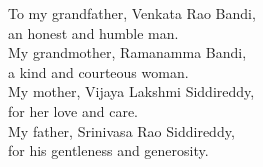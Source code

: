 \documentclass[final,numrefs,sort&compress,noinfo]{nddiss2e}
\begin{document}
\renewcommand{\dedicationname}{Dedicated to}

\begin{dedication}
  To my grandfather, Venkata Rao Bandi, \\an honest and humble man. \\My grandmother, Ramanamma Bandi, \\a kind and courteous woman. \\My mother, Vijaya Lakshmi Siddireddy, \\for her love and care. \\My father, Srinivasa Rao Siddireddy, \\for his gentleness and generosity.
\end{dedication}

\tableofcontents
\listoffigures
\listoftables


\end{document}
